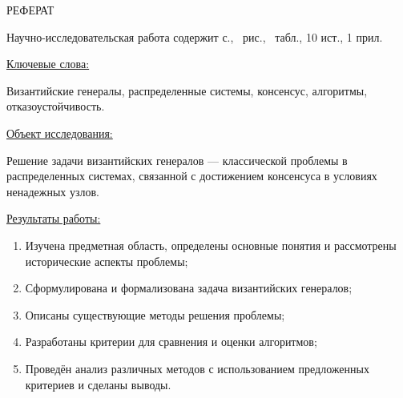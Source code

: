 
\setcounter{page}{2} %

\begin{center}
    \MakeUppercase{\large Реферат}
\end{center}

Научно-исследовательская работа содержит \pageref*{LastPage} с., \totalfigures\ рис., \totaltables\ табл., 10 ист., 1 прил.

\underline{Ключевые слова:}

Византийские генералы, распределенные системы, консенсус, алгоритмы, отказоустойчивость.


\underline{Объект исследования:}

Решение задачи византийских генералов — классической проблемы в распределенных системах, связанной с достижением консенсуса в условиях ненадежных узлов.


\underline{Результаты работы:}

\begin{enumerate}

\item Изучена предметная область, определены основные понятия и рассмотрены исторические аспекты проблемы; 

\item Сформулирована и формализована задача византийских генералов; 

\item Описаны существующие методы решения проблемы; 

\item Разработаны критерии для сравнения и оценки алгоритмов; 

\item Проведён анализ различных методов с использованием предложенных критериев и сделаны выводы.

\end{enumerate}